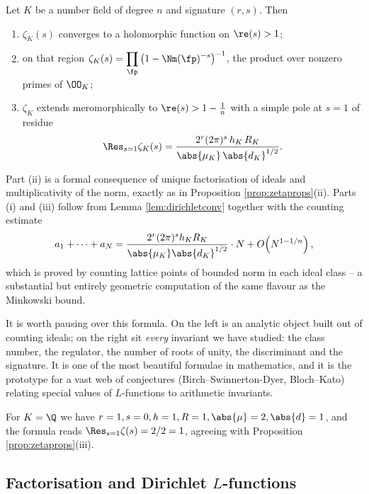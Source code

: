 \begin{theorem}\label{thm:acnf}
	Let $K$ be a number field of degree $n$ and signature $(r,s)$. Then
	\begin{enumerate}[label=(\roman*)]
		\item $\zeta_K(s)$ converges to a holomorphic function on $\re(s)>1$;
		\item on that region $\displaystyle\zeta_K(s) = \prod_{\fp}\left(1-\Nm(\fp)^{-s}\right)^{-1}$, the product over nonzero primes of $\OO_K$;
		\item $\zeta_K$ extends meromorphically to $\re(s) > 1 - \tfrac1n$ with a simple pole at $s = 1$ of residue
		$$\Res_{s=1}\zeta_K(s) = \frac{2^{r}(2\pi)^{s}\,h_K\,R_K}{\abs{\mu_K}\,\abs{d_K}^{1/2}}.$$
	\end{enumerate}
\end{theorem}

Part (ii) is a formal consequence of unique factorisation of ideals and multiplicativity of the norm, exactly as in Proposition \ref{prop:zetaprops}(ii). Parts (i) and (iii) follow from Lemma \ref{lem:dirichletconv} together with the counting estimate
$$a_1+\dots+a_N = \frac{2^{r}(2\pi)^{s}h_KR_K}{\abs{\mu_K}\abs{d_K}^{1/2}}\cdot N + O\!\left(N^{1-1/n}\right),$$
which is proved by counting lattice points of bounded norm in each ideal class -- a substantial but entirely geometric computation of the same flavour as the Minkowski bound.

It is worth pausing over this formula. On the left is an analytic object built out of counting ideals; on the right sit \emph{every} invariant we have studied: the class number, the regulator, the number of roots of unity, the discriminant and the signature. It is one of the most beautiful formulae in mathematics, and it is the prototype for a vast web of conjectures (Birch--Swinnerton-Dyer, Bloch--Kato) relating special values of $L$-functions to arithmetic invariants.

\begin{example}
	For $K = \Q$ we have $r = 1, s= 0, h = 1, R = 1, \abs{\mu} = 2, \abs{d} = 1$, and the formula reads $\Res_{s=1}\zeta(s) = 2/2 = 1$, agreeing with Proposition \ref{prop:zetaprops}(iii).
\end{example}

\subsection{Factorisation and Dirichlet $L$-functions}

